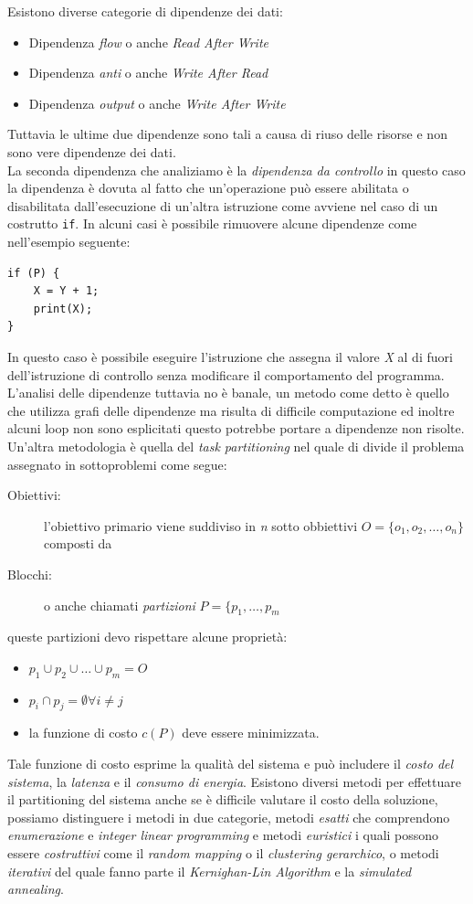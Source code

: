 Esistono diverse categorie di dipendenze dei dati:
\begin{itemize}
\item Dipendenza \emph{flow} o anche \emph{Read After Write}
\item Dipendenza \emph{anti} o anche \emph{Write After Read}
\item Dipendenza \emph{output} o anche \emph{Write After Write}
\end{itemize}
Tuttavia le ultime due dipendenze sono tali a causa di riuso delle risorse e non sono vere dipendenze dei dati.\\
La seconda dipendenza che analiziamo è la \emph{dipendenza da controllo} in questo caso la dipendenza è dovuta al fatto che un'operazione può essere abilitata o disabilitata dall'esecuzione di un'altra istruzione come avviene nel caso di un costrutto \texttt{if}. In alcuni casi è possibile rimuovere alcune dipendenze come nell'esempio seguente:
\begin{verbatim}
if (P) {
    X = Y + 1;
    print(X);
}
\end{verbatim}
In questo caso è possibile eseguire l'istruzione che assegna il valore \emph{X} al di fuori dell'istruzione di controllo senza modificare il comportamento del programma.\\
L'analisi delle dipendenze tuttavia no è banale, un metodo come detto è quello che utilizza grafi delle dipendenze ma risulta di difficile computazione ed inoltre alcuni loop non sono esplicitati questo potrebbe portare a dipendenze non risolte. Un'altra metodologia è quella del \emph{task partitioning} nel quale di divide il problema assegnato in sottoproblemi come segue:
\begin{description}
\item[Obiettivi:] l'obiettivo primario viene suddiviso in \emph{n} sotto obbiettivi $O=\{o_1,o_2,\dots, o_n\}$ composti da 
\item[Blocchi:] o anche chiamati \emph{partizioni} $P=\{p_1,\dots, p_m$
\end{description}
queste partizioni devo rispettare alcune proprietà:
\begin{itemize}
\item $p_1 \cup p_2 \cup \dots \cup p_m = O$
\item $p_i\cap p_j = \emptyset \forall i\neq j$
\item la funzione di costo $c(P)$ deve essere minimizzata.
\end{itemize}
Tale funzione di costo esprime la qualità del sistema e può includere il \emph{costo del sistema}, la \emph{latenza} e il \emph{consumo di energia}.
Esistono diversi metodi per effettuare il partitioning del sistema anche se è difficile valutare il costo della soluzione, possiamo distinguere i metodi in due categorie, metodi \emph{esatti} che comprendono \emph{enumerazione} e \emph{integer linear programming} e metodi \emph{euristici} i quali possono essere \emph{costruttivi} come il \emph{random mapping} o il \emph{clustering gerarchico}, o metodi \emph{iterativi} del quale fanno parte il \emph{Kernighan-Lin Algorithm} e la \emph{simulated annealing}.
